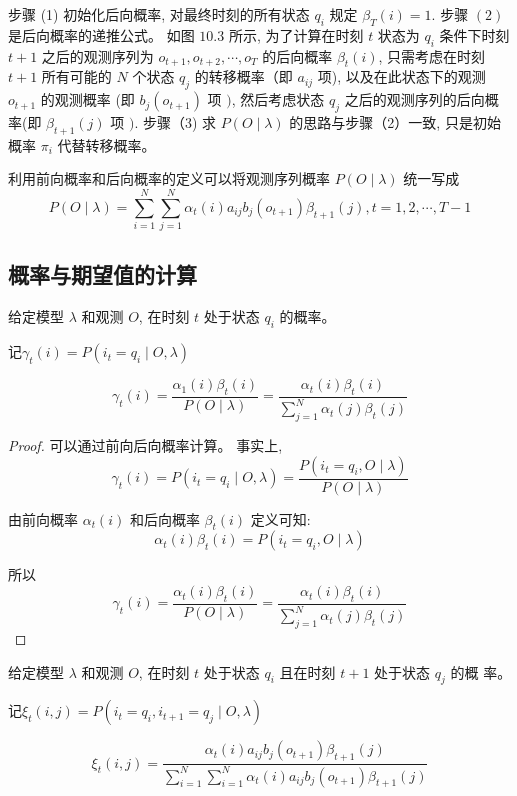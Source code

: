 步骤 (1) 初始化后向概率, 对最终时刻的所有状态 $ q_{i} $ 规定 $ \beta_{T}(i)=1 $. 步骤 $ (2) $ 是后向概率的递推公式。 如图 $ 10.3 $ 所示, 为了计算在时刻 $ t $ 状态为 $ q_{i} $ 条件下时刻$ t+1 $ 之后的观测序列为 $ o_{t+1}, o_{t+2}, \cdots, o_{T} $ 的后向概率 $ \beta_{t}(i) $, 只需考虑在时刻 $ t+1 $ 所有可能的 $ N $ 个状态 $ q_{j} $ 的转移概率（即 $ a_{i j} $ 项), 以及在此状态下的观测 $ o_{t+1} $ 的观测概率 (即 $ b_{j}\left(o_{t+1}\right) $ 项 $ ) $, 然后考虑状态 $ q_{j} $ 之后的观测序列的后向概率(即 $ \beta_{t+1}(j) $ 项 $ ) $. 步骤（3) 求 $ P(O \mid \lambda) $ 的思路与步骤（2）一致, 只是初始概率 $ \pi_{i} $ 代替转移概率。

利用前向概率和后向概率的定义可以将观测序列概率 $ P(O \mid \lambda) $ 统一写成
$$
P(O \mid \lambda)=\sum_{i=1}^{N} \sum_{j=1}^{N} \alpha_{t}(i) a_{i j} b_{j}\left(o_{t+1}\right) \beta_{t+1}(j), t=1,2, \cdots, T-1
$$

\subsection{概率与期望值的计算}

\begin{theorem}
    \label{Thm:ComputeGamma}
    给定模型 $ \lambda $ 和观测 $ O $, 在时刻 $ t $ 处于状态 $ q_{i} $ 的概率。 
    
    记$ \gamma_{t}(i)=P\left(i_{t}=q_{i} \mid O, \lambda\right) $

$$ \gamma_{t}(i)=\frac{\alpha_{1}(i) \beta_{t}(i)}{P(O \mid \lambda)}=\frac{\alpha_{t}(i) \beta_{t}(i)}{\sum_{j=1}^{N} \alpha_{t}(j) \beta_{t}(j)} $$
\end{theorem}


\begin{proof}
    可以通过前向后向概率计算。 事实上,
$$
\gamma_{t}(i)=P\left(i_{t}=q_{i} \mid O, \lambda\right)=\frac{P\left(i_{t}=q_{i}, O \mid \lambda\right)}{P(O \mid \lambda)}
$$

由前向概率 $ \alpha_{t}(i) $ 和后向概率 $ \beta_{t}(i) $ 定义可知:
$$
\alpha_{t}(i) \beta_{t}(i)=P\left(i_{t}=q_{i}, O \mid \lambda\right)
$$

所以
$$ \gamma_{t}(i)=\frac{\alpha_{t}(i) \beta_{t}(i)}{P(O \mid \lambda)}=\frac{\alpha_{t}(i) \beta_{t}(i)}{\sum_{j=1}^{N} \alpha_{t}(j) \beta_{t}(j)} $$
\end{proof}

\begin{theorem}
    \label{Thm:ComputeXi}
    给定模型 $ \lambda $ 和观测 $ O $, 在时刻 $ t $ 处于状态 $ q_{i} $ 且在时刻 $ t+1 $ 处于状态 $ q_{j} $ 的概 率。 
    
    记$ \xi_{t}(i, j)=P\left(i_{t}=q_{i}, i_{t+1}=q_{j} \mid O, \lambda\right) $

$$ \xi_{t}(i, j)=\frac{\alpha_{t}(i) a_{i j} b_{j}\left(o_{t+1}\right) \beta_{t+1}(j)}{\sum_{i=1}^{N} \sum_{i=1}^{N} \alpha_{t}(i) a_{i j} b_{j}\left(o_{t+1}\right) \beta_{t+1}(j)} $$
\end{theorem}




